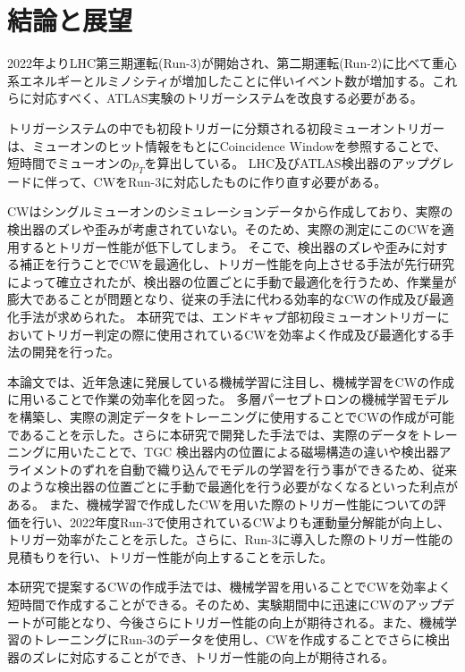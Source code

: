 \chapter{結論と展望}\label{chapter6}
2022年よりLHC第三期運転(Run-3)が開始され、第二期運転(Run-2)に比べて重心系エネルギーとルミノシティが増加したことに伴いイベント数が増加する。これらに対応すべく、ATLAS実験のトリガーシステムを改良する必要がある。

トリガーシステムの中でも初段トリガーに分類される初段ミューオントリガーは、ミューオンのヒット情報をもとにCoincidence Windowを参照することで、短時間でミューオンの$p_T$を算出している。
LHC及びATLAS検出器のアップグレードに伴って、CWをRun-3に対応したものに作り直す必要がある。

CWはシングルミューオンのシミュレーションデータから作成しており、実際の検出器のズレや歪みが考慮されていない。そのため、実際の測定にこのCWを適用するとトリガー性能が低下してしまう。
そこで、検出器のズレや歪みに対する補正を行うことでCWを最適化し、トリガー性能を向上させる手法が先行研究によって確立されたが、検出器の位置ごとに手動で最適化を行うため、作業量が膨大であることが問題となり、従来の手法に代わる効率的なCWの作成及び最適化手法が求められた。
本研究では、エンドキャプ部初段ミューオントリガーにおいてトリガー判定の際に使用されているCWを効率よく作成及び最適化する手法の開発を行った。

本論文では、近年急速に発展している機械学習に注目し、機械学習をCWの作成に用いることで作業の効率化を図った。
多層パーセプトロンの機械学習モデルを構築し、実際の測定データをトレーニングに使用することでCWの作成が可能であることを示した。さらに本研究で開発した手法では、実際のデータをトレーニングに用いたことで、TGC 検出器内の位置による磁場構造の違いや検出器アライメントのずれを自動で織り込んでモデルの学習を行う事ができるため、従来のような検出器の位置ごとに手動で最適化を行う必要がなくなるといった利点がある。
また、機械学習で作成したCWを用いた際のトリガー性能についての評価を行い、2022年度Run-3で使用されているCWよりも運動量分解能が向上し、トリガー効率がたことを示した。さらに、Run-3に導入した際のトリガー性能の見積もりを行い、トリガー性能が向上することを示した。

本研究で提案するCWの作成手法では、機械学習を用いることでCWを効率よく短時間で作成することができる。そのため、実験期間中に迅速にCWのアップデートが可能となり、今後さらにトリガー性能の向上が期待される。また、機械学習のトレーニングにRun-3のデータを使用し、CWを作成することでさらに検出器のズレに対応することができ、トリガー性能の向上が期待される。




